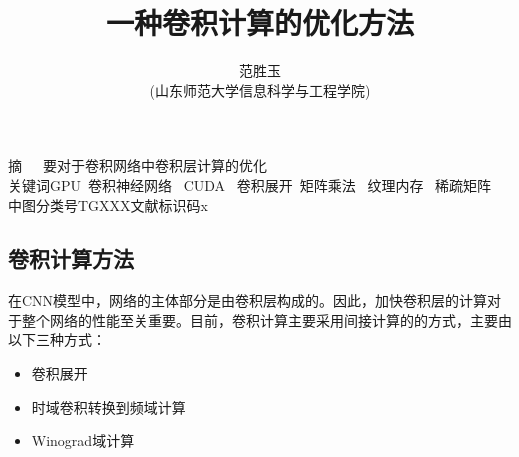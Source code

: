 \documentclass[a4paper,11pt,onecolumn,towside]{article}
\title{\huge{一种卷积计算的优化方法}}
\author{范胜玉\\[2pt]
\normalsize
(山东师范大学信息科学与工程学院) \\[2pt]}
\date{}
\begin{document}
\begin{CJK*}{GBK}{song}

\newcommand{\supercite}[1]{\textsuperscript{\cite{#1}}}
\maketitle

\setlength{\oddsidemargin}{ 1cm}  %
\setlength{\evensidemargin}{\oddsidemargin}
\setlength{\textwidth}{13.50cm}
\vspace{-.8cm}
\begin{center}
\parbox{\textwidth}{
摘~~~要\quad {}对于卷积网络中卷积层计算的优化\\
关键词\quad{}GPU~卷积神经网络~ CUDA~ 卷积展开~矩阵乘法 ~纹理内存~ 稀疏矩阵\\
中图分类号\quad TGXXX\qquad  {}文献标识码\quad x}
\end{center}
\setlength{\oddsidemargin}{-.5cm}  %
\setlength{\evensidemargin}{\oddsidemargin}
\setlength{\textwidth}{17.00cm}

\begin{multicols}{2}
\renewcommand\thesection{\arabic{section}}
\section{卷积计算方法}
在CNN模型中，网络的主体部分是由卷积层构成的。因此，加快卷积层的计算对于整个网络的性能至关重要。目前，卷积计算主要采用间接计算的的方式，主要由以下三种方式：
\begin{itemize}
  \item 卷积展开\cite{im2col+GEMM}
  \item 时域卷积转换到频域计算\cite{FFT}
  \item Winograd域计算\cite{Winograd}
\end{itemize}

\end{multicols}
\end{CJK*}
\end{document}
